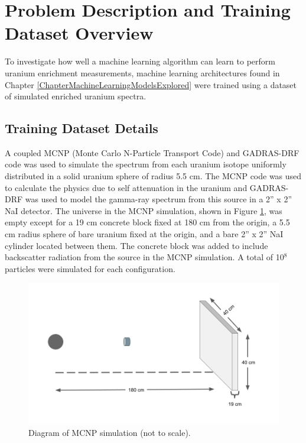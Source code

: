 \section{Problem Description and Training Dataset Overview}

To investigate how well a machine learning algorithm can learn to perform uranium enrichment measurements, machine learning architectures found in Chapter \ref{ChapterMachineLearningModelsExplored} were trained using a dataset of simulated enriched uranium spectra.



\subsection{Training Dataset Details}

A coupled MCNP (Monte Carlo N-Particle Transport Code) and GADRAS-DRF code was used to simulate the spectrum from each uranium isotope uniformly distributed in a solid uranium sphere of radius 5.5 cm. The MCNP code was used to calculate the physics due to self attenuation in the uranium and GADRAS-DRF was used to model the gamma-ray spectrum from this source in a 2'' x 2'' NaI detector. The universe in the MCNP simulation, shown in Figure \ref{fig:mcnp_diagram}, was empty except for a 19 cm concrete block fixed at 180 cm from the origin, a 5.5 cm radius sphere of bare uranium fixed at the origin, and a bare 2'' x 2'' NaI cylinder located between them. The concrete block was added to include backscatter radiation from the source in the MCNP simulation. A total of 10$^{8}$ particles were simulated for each configuration.

\begin{figure}[H]
	\centering
    \includegraphics[trim=50 50 50 50,clip,width=0.99\linewidth]{images/mcnp_diagram.png}
	\caption{Diagram of MCNP simulation (not to scale).}
	\label{fig:mcnp_diagram}
\end{figure}

